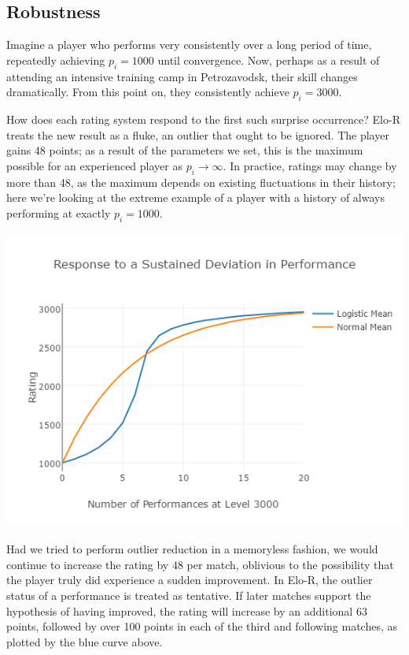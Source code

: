 \documentclass{article}
\begin{document}
\subsection{Robustness}

Imagine a player who performs very consistently over a long period of time, repeatedly achieving $p_i = 1000$ until convergence. Now, perhaps as a result of attending an intensive training camp in Petrozavodsk, their skill changes dramatically. From this point on, they consistently achieve $p_i = 3000$.

How does each rating system respond to the first such surprise occurrence? Elo-R treats the new result as a fluke, an outlier that ought to be ignored. The player gains 48 points; as a result of the parameters we set, this is the maximum possible for an experienced player as $p_i \rightarrow \infty$. In practice, ratings may change by more than 48, as the maximum depends on existing fluctuations in their history; here we're looking at the extreme example of a player with a history of always performing at exactly $p_i = 1000$.

\begin{center} \includegraphics[scale=0.5]{../images/ResponsePlot.png} \end{center}

Had we tried to perform outlier reduction in a memoryless fashion, we would continue to increase the rating by 48 per match, oblivious to the possibility that the player truly did experience a sudden improvement. In Elo-R, the outlier status of a performance is treated as tentative. If later matches support the hypothesis of having improved, the rating will increase by an additional 63 points, followed by over 100 points in each of the third and following matches, as plotted by the blue curve above.
\end{document}

